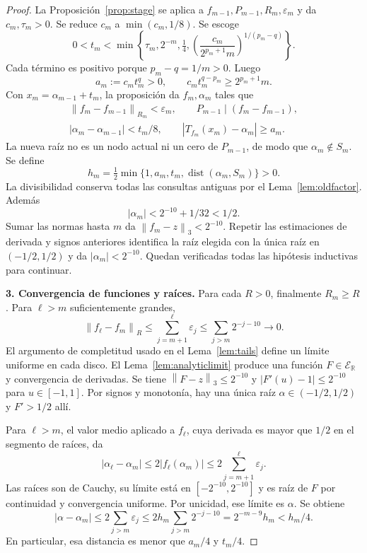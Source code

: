 \documentclass[11pt,a4paper]{article}
\numberwithin{equation}{section}
\theoremstyle{definition}
\theoremstyle{remark}
\newcommand{\R}{\mathbb R}
\newcommand{\ER}{\mathcal E_{\R}}
\newcommand{\norm}[1]{\left\lVert#1\right\rVert}
\DeclareMathOperator{\dist}{dist}
\newcommand{\paso}[1]{\par\smallskip\noindent\textbf{#1}\quad}
\begin{document}
\begin{proof}
La Proposición~\ref{prop:stage} se aplica a $f_{m-1},P_{m-1},R_m,\varepsilon_m$ y da $c_m,\tau_m>0$. Se reduce $c_m$ a $\min(c_m,1/8)$. Se escoge
\begin{equation}\label{eq:allpchoose}
0<t_m<\min\left\{\tau_m,2^{-m},\tfrac14,
\left(\frac{c_m}{2^{p_m+1}m}\right)^{1/(p_m-q)}\right\}.
\end{equation}
Cada término es positivo porque $p_m-q=1/m>0$. Luego
\begin{equation}\label{eq:allpquotient}
a_m:=c_mt_m^q>0,\qquad
c_mt_m^{q-p_m}\ge2^{p_m+1}m.
\end{equation}
Con $x_m=\alpha_{m-1}+t_m$, la proposición da $f_m,\alpha_m$ tales que
\begin{gather*}
\norm{f_m-f_{m-1}}_{R_m}<\varepsilon_m,\qquad
P_{m-1}\mid(f_m-f_{m-1}),\\
|\alpha_m-\alpha_{m-1}|<t_m/8,\qquad
|T_{f_m}(x_m)-\alpha_m|\ge a_m.
\end{gather*}
La nueva raíz no es un nodo actual ni un cero de $P_{m-1}$, de modo que $\alpha_m\notin S_m$. Se define
\[
h_m=\tfrac12\min\{1,a_m,t_m,\dist(\alpha_m,S_m)\}>0.
\]
La divisibilidad conserva todas las consultas antiguas por el Lema~\ref{lem:oldfactor}. Además
\[
|\alpha_m|<2^{-10}+1/32<1/2.
\]
Sumar las normas hasta $m$ da $\norm{f_m-z}_3<2^{-10}$. Repetir las estimaciones de derivada y signos anteriores identifica la raíz elegida con la única raíz en $(-1/2,1/2)$ y da $|\alpha_m|<2^{-10}$. Quedan verificadas todas las hipótesis inductivas para continuar.

\paso{3. Convergencia de funciones y raíces.}
Para cada $R>0$, finalmente $R_m\ge R$. Para $\ell>m$ suficientemente grandes,
\[
\norm{f_\ell-f_m}_R\le\sum_{j=m+1}^{\ell}\varepsilon_j
\le\sum_{j>m}2^{-j-10}\longrightarrow0.
\]
El argumento de completitud usado en el Lema~\ref{lem:tails} define un límite uniforme en cada disco. El Lema~\ref{lem:analyticlimit} produce una función $F\in\ER$ y convergencia de derivadas. Se tiene $\norm{F-z}_3\le2^{-10}$ y $|F'(u)-1|\le2^{-10}$ para $u\in[-1,1]$. Por signos y monotonía, hay una única raíz $\alpha\in(-1/2,1/2)$ y $F'>1/2$ allí.

Para $\ell>m$, el valor medio aplicado a $f_\ell$, cuya derivada es mayor que $1/2$ en el segmento de raíces, da
\[
|\alpha_\ell-\alpha_m|\le2|f_\ell(\alpha_m)|
\le2\sum_{j=m+1}^{\ell}\varepsilon_j.
\]
Las raíces son de Cauchy, su límite está en $[-2^{-10},2^{-10}]$ y es raíz de $F$ por continuidad y convergencia uniforme. Por unicidad, ese límite es $\alpha$. Se obtiene
\begin{equation}\label{eq:allptail}
|\alpha-\alpha_m|\le2\sum_{j>m}\varepsilon_j
\le2h_m\sum_{j>m}2^{-j-10}
=2^{-m-9}h_m<h_m/4.
\end{equation}
En particular, esa distancia es menor que $a_m/4$ y $t_m/4$.


\end{proof}
\end{document}
